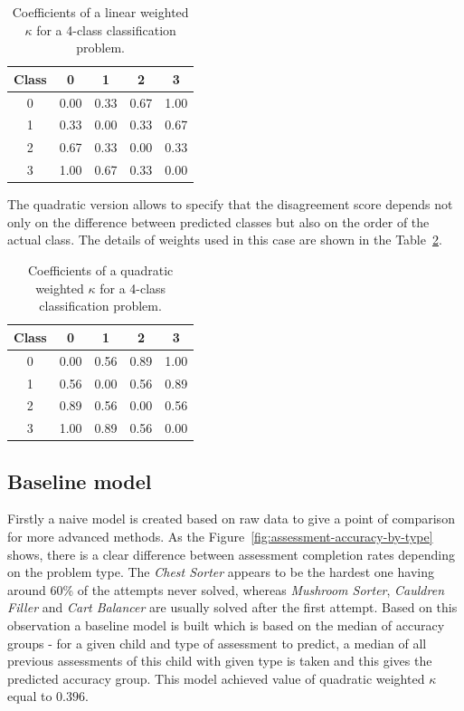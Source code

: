 \documentclass[fleqn,10pt]{SelfArx} %
\begin{document}
\begin{table}
    \caption{Coefficients of a linear weighted $\kappa$ for a 4-class classification problem.}
    \centering
    \begin{tabular}{c|cccc}
        Class & 0 & 1 & 2 & 3 \\
        \hline
        0 & 0.00 & 0.33 & 0.67 & 1.00 \\
        1 & 0.33 & 0.00 & 0.33 & 0.67 \\
        2 & 0.67 & 0.33 & 0.00 & 0.33 \\
        3 & 1.00 & 0.67 & 0.33 & 0.00 \\
    \end{tabular}
    \label{tab:linear-kappa}
\end{table}

The quadratic version allows to specify that the disagreement score depends not only on the difference between predicted classes but also on the order of the actual class.
The details of weights used in this case are shown in the Table~\ref{tab:quadratic-kappa}.

\begin{table}
    \caption{Coefficients of a quadratic weighted $\kappa$ for a 4-class classification problem.}
    \centering
    \begin{tabular}{c|cccc}
        Class & 0 & 1 & 2 & 3 \\
        \hline
        0 & 0.00 & 0.56 & 0.89 & 1.00 \\
        1 & 0.56 & 0.00 & 0.56 & 0.89 \\
        2 & 0.89 & 0.56 & 0.00 & 0.56 \\
        3 & 1.00 & 0.89 & 0.56 & 0.00 \\
    \end{tabular}
    \label{tab:quadratic-kappa}
\end{table}

\subsection{Baseline model}

Firstly a naive model is created based on raw data to give a point of comparison for more advanced methods.
As the Figure~\ref{fig:assessment-accuracy-by-type} shows, there is a clear difference between assessment completion rates depending on the problem type.
The \textit{Chest Sorter} appears to be the hardest one having around 60\% of the attempts never solved, whereas \textit{Mushroom Sorter}, \textit{Cauldren Filler} and \textit{Cart Balancer} are usually solved after the first attempt.
Based on this observation a baseline model is built which is based on the median of accuracy groups - for a given child and type of assessment to predict, a median of all previous assessments of this child with given type is taken and this gives the predicted accuracy group.
This model achieved value of quadratic weighted $\kappa$ equal to $0.396$.
\end{document}
